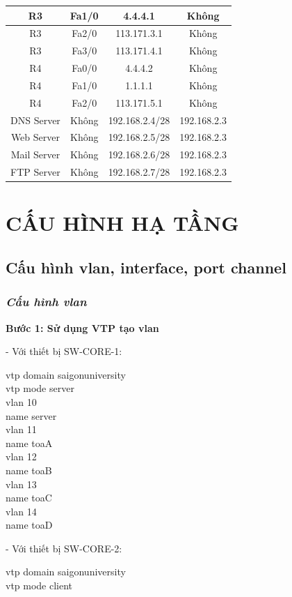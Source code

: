 \documentclass[12pt, a4paper]{article}
\begin{document}
\begin{table}[H]
\begin{tabular}{|c|c|c|c|}
			\hline
			R3 & Fa1/0 & 4.4.4.1 & Không\\
			\hline
			R3 & Fa2/0 & 113.171.3.1 & Không\\
			\hline
			R3 & Fa3/0 & 113.171.4.1 & Không\\
			\hline
			R4 & Fa0/0 & 4.4.4.2 & Không\\
			\hline
			R4 & Fa1/0 & 1.1.1.1 & Không\\
			\hline
			R4 & Fa2/0 & 113.171.5.1 & Không\\
			\hline
			DNS Server & Không & 192.168.2.4/28 & 192.168.2.3\\
			\hline
			Web Server & Không & 192.168.2.5/28 & 192.168.2.3\\
			\hline
			Mail Server & Không & 192.168.2.6/28 & 192.168.2.3\\
			\hline
			FTP Server & Không & 192.168.2.7/28 & 192.168.2.3\\
			\hline
		\end{tabular}
	\end{table}
	
	\newpage
	\section{CẤU HÌNH HẠ TẦNG}
	\subsection{Cấu hình vlan, interface, port channel}
	\subsubsection{\textit{Cấu hình vlan}} 
	\begin{justify}
		\textbf{Bước 1: Sử dụng VTP tạo vlan}
	\end{justify}
	\begin{flushleft}
		- Với thiết bị SW-CORE-1:
		\begin{tcolorbox} 
			vtp domain saigonuniversity\\
			vtp mode server\\
			vlan 10\\
			name server\\
			vlan 11\\
			name toaA\\
			vlan 12\\
			name toaB\\
			vlan 13\\
			name toaC\\
			vlan 14\\
			name toaD
		\end{tcolorbox}
		- Với thiết bị SW-CORE-2:
		\begin{tcolorbox}
			vtp domain saigonuniversity\\
			vtp mode client
		\end{tcolorbox}
	\end{flushleft}
\end{document}
